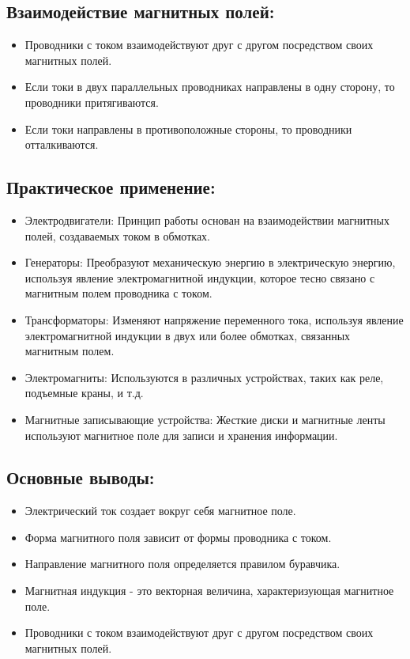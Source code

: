 \documentclass[a4paper,12pt]{article}
\begin{document}
\vspace{-9pt}
\subsection*{Взаимодействие магнитных полей:}
\vspace{-3pt}
\begin{itemize}
    \item Проводники с током взаимодействуют друг с другом посредством своих магнитных полей.
    \item Если токи в двух параллельных проводниках направлены в одну сторону, то проводники притягиваются.
    \item Если токи направлены в противоположные стороны, то проводники отталкиваются.
\end{itemize}

\vspace{-9pt}
\subsection*{Практическое применение:}
\vspace{-3pt}
\begin{itemize}
    \item Электродвигатели: Принцип работы основан на взаимодействии магнитных полей, создаваемых током в обмотках.
    \item Генераторы: Преобразуют механическую энергию в электрическую энергию, используя явление электромагнитной индукции, которое тесно связано с магнитным полем проводника с током.
    \item Трансформаторы: Изменяют напряжение переменного тока, используя явление электромагнитной индукции в двух или более обмотках, связанных магнитным полем.
    \item Электромагниты: Используются в различных устройствах, таких как реле, подъемные краны, и т.д.
    \item Магнитные записывающие устройства: Жесткие диски и магнитные ленты используют магнитное поле для записи и хранения информации.
\end{itemize}

\vspace{-9pt}
\subsection*{Основные выводы:}
\vspace{-3pt}
\begin{itemize}
    \item Электрический ток создает вокруг себя магнитное поле.
    \item Форма магнитного поля зависит от формы проводника с током.
    \item Направление магнитного поля определяется правилом буравчика.
    \item Магнитная индукция - это векторная величина, характеризующая магнитное поле.
    \item Проводники с током взаимодействуют друг с другом посредством своих магнитных полей.
\end{itemize}
\end{document}
